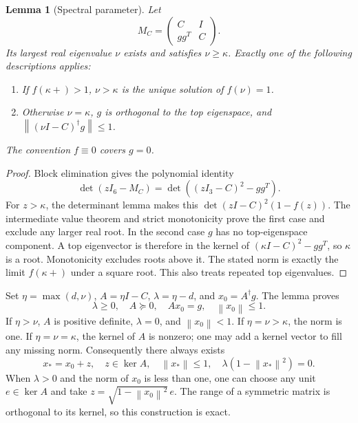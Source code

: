 \documentclass[11pt]{article}
\newtheorem{lemma}[theorem]{Lemma}
\theoremstyle{remark}\newtheorem{remark}[theorem]{Remark}
\newcommand{\norm}[1]{\left\lVert#1\right\rVert}
\begin{document}
\begin{lemma}[Spectral parameter]\label{lem:spectral}
Let
\[
 M_C=\begin{pmatrix}C&I\\gg^T&C\end{pmatrix}.
\]
Its largest real eigenvalue $\nu$ exists and satisfies $\nu\geq\kappa$.
Exactly one of the following descriptions applies:
\begin{enumerate}
 \item If $f(\kappa+)>1$, $\nu>\kappa$ is the unique solution of $f(\nu)=1$.
 \item Otherwise $\nu=\kappa$, $g$ is orthogonal to the top eigenspace,
 and $\norm{(\nu I-C)^\dagger g}\leq1$.
\end{enumerate}
The convention $f\equiv0$ covers $g=0$.
\end{lemma}
\begin{proof}
Block elimination gives the polynomial identity
\begin{equation}\label{eq:det}
 \det(zI_6-M_C)=\det((zI_3-C)^2-gg^T).
\end{equation}
For $z>\kappa$, the determinant lemma makes this
$\det(zI-C)^2(1-f(z))$. The intermediate value theorem and strict
monotonicity prove the first case and exclude any larger real root.
In the second case $g$ has no top-eigenspace component. A top eigenvector is
therefore in the kernel of $(\kappa I-C)^2-gg^T$, so $\kappa$ is a root.
Monotonicity excludes roots above it. The stated norm is exactly the limit
$f(\kappa+)$ under a square root. This also treats repeated top eigenvalues.
\end{proof}

Set $\eta=\max(d,\nu)$, $A=\eta I-C$, $\lambda=\eta-d$, and
$x_0=A^\dagger g$. The lemma proves
\begin{equation}\label{eq:conditions}
 \lambda\geq0,\quad A\succeq0,\quad Ax_0=g,\quad \norm{x_0}\leq1.
\end{equation}
If $\eta>\nu$, $A$ is positive definite, $\lambda=0$, and
$\norm{x_0}<1$. If $\eta=\nu>\kappa$, the norm is one. If
$\eta=\nu=\kappa$, the kernel of $A$ is nonzero; one may add a kernel
vector to fill any missing norm. Consequently there always exists
\begin{equation}\label{eq:attainment}
 x_*=x_0+z,\quad z\in\ker A,\quad \norm{x_*}\leq1,
 \quad\lambda(1-\norm{x_*}^2)=0.
\end{equation}
When $\lambda>0$ and the norm of $x_0$ is less than one, one can choose any
unit $e\in\ker A$ and take $z=\sqrt{1-\norm{x_0}^2}\,e$. The range of a
symmetric matrix is orthogonal to its kernel, so this construction is exact.
\end{document}
